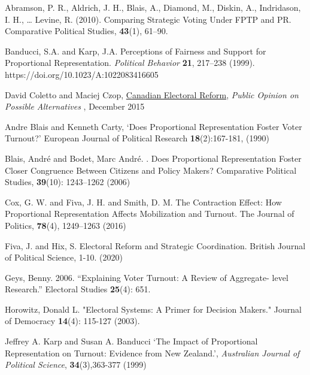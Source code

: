 \begin{thebibliography}{99}

Abramson, P. R., Aldrich, J. H., Blais, A., Diamond, M., Diskin, A., Indridason, I. H., … Levine, R. (2010). Comparing Strategic Voting Under FPTP and PR. Comparative Political Studies, \textbf{43}(1), 61–90.

Banducci, S.A. and Karp, J.A. Perceptions of Fairness and Support for Proportional Representation.
\emph{Political Behavior} \textbf{21}, 217–238 (1999). https://doi.org/10.1023/A:1022083416605

David Coletto and Maciej Czop,
{\color{blue} \href{https://d3n8a8pro7vhmx.cloudfront.net/broadbent/pages/4770/attachments/original/1448994262/Canadian_Electoral_Reform_-_Report.pdf?1448994262}{Canadian Electoral Reform}},
{\emph{Public Opinion on Possible Alternatives} }, December 2015

Andre Blais and Kenneth Carty,
`Does Proportional Representation Foster Voter Turnout?'
European Journal of Political Research \textbf{18}(2):167-181, (1990)

Blais, Andr\'e and Bodet, Marc Andr\'e. . Does Proportional Representation Foster Closer Congruence Between Citizens and Policy Makers? Comparative Political Studies, \textbf{39}(10): 1243–1262 (2006)

Cox, G. W. and Fiva, J. H. and Smith, D. M.  The Contraction Effect: How Proportional Representation Affects Mobilization and Turnout. The Journal of Politics, \textbf{78}(4), 1249–1263 (2016)

Fiva, J. and Hix, S. Electoral Reform and Strategic Coordination.
British Journal of Political Science, 1-10. (2020)

Geys, Benny. 2006. “Explaining Voter Turnout: A Review of Aggregate-
level Research.” Electoral Studies \textbf{25}(4): 651.

Horowitz, Donald L. "Electoral Systems: A Primer for Decision Makers."
Journal of Democracy \textbf{14}(4): 115-127 (2003).

Jeffrey A. Karp and Susan A. Banducci
`The Impact of Proportional Representation on Turnout: Evidence from New Zealand.',
\emph{Australian Journal of Political Science}, \textbf{34}(3),363-377 (1999)


\end{thebibliography}
